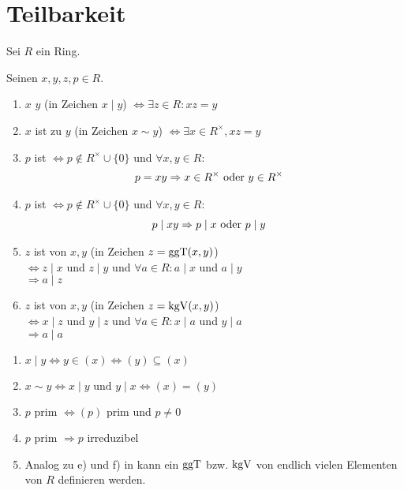 \section{Teilbarkeit}

Sei $R$ ein  Ring.

\begin{definition}
	Seinen $x,y,z,p \in R$.
	\begin{enumerate}
		\item $x$  $y$ (in Zeichen $x \mid y$) $\Leftrightarrow \exists z \in R: xz = y$
		\item $x$ ist  zu $y$ (in Zeichen $x \sim y$) $\Leftrightarrow \exists x \in R^{\times}, xz = y$
		\item $p$ ist  $\Leftrightarrow p \not \in R^{\times} \cup \{  0\}$ und $\forall x,y \in R$:
		\begin{align}
			p = xy &\Rightarrow x \in R^{\times} \text{ oder } y \in R^{\times} \notag
		\end{align}
		\item $p$ ist  $\Leftrightarrow  p \not \in R^{\times} \cup \{ 0 \}$ und $\forall x,y \in R$:
		\begin{align}
			p \mid xy &\Rightarrow p \mid x \text{ oder } p \mid y \notag
		\end{align}
		\item $z$ ist  von $x,y$ (in Zeichen $z = \operatorname{ggT}(x,y)$) \\
		$\Leftrightarrow  z \mid x$ und $z \mid y$ und $\forall a \in R: a\mid x$ und $a \mid y$\\
		$\Rightarrow a \mid z$
		\item $z$ ist  von $x,y$ (in Zeichen $z = \operatorname{kgV}(x,y)$)\\
		$\Leftrightarrow x \mid z$ und $y \mid z$ und $\forall a \in R: x \mid a$ und $y \mid a$\\
		$\Rightarrow a \mid a$ 
	\end{enumerate}
\end{definition}

\begin{remark}
	\begin{enumerate}
		\item $x \mid y \Leftrightarrow y \in (x) \Leftrightarrow (y) \subseteq (x)$
		\item $x \sim y \Leftrightarrow x \mid y \text{ und } y \mid x \Leftrightarrow (x) = (y)$
		\item $p$ prim $\Leftrightarrow (p)$ prim und $p \neq 0$
		\item $p$ prim $\Rightarrow p$ irreduzibel
		\item Analog zu e) und f) in  kann ein $\operatorname{ggT}$ bzw. $\operatorname{kgV}$ von endlich vielen Elementen von $R$ definieren werden.
	\end{enumerate}
\end{remark}

